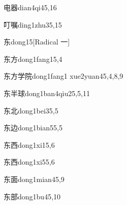 \begin{verbete}{电器}{dian4qi4}{5,16}
\end{verbete}

\begin{verbete}{叮嘱}{ding1zhu3}{5,15}
\end{verbete}

\begin{verbete}{东}{dong1}{5}[Radical ⼀]
\end{verbete}

\begin{verbete}{东方}{dong1fang1}{5,4}
\end{verbete}

\begin{verbete}{东方学院}{dong1fang1 xue2yuan4}{5,4,8,9}
\end{verbete}

\begin{verbete}{东半球}{dong1ban4qiu2}{5,5,11}
\end{verbete}

\begin{verbete}{东北}{dong1bei3}{5,5}
\end{verbete}

\begin{verbete}{东边}{dong1bian5}{5,5}
\end{verbete}

\begin{verbete}{东西}{dong1xi1}{5,6}
\end{verbete}

\begin{verbete}{东西}{dong1xi5}{5,6}
\end{verbete}

\begin{verbete}{东面}{dong1mian4}{5,9}
\end{verbete}

\begin{verbete}{东部}{dong1bu4}{5,10}
\end{verbete}

